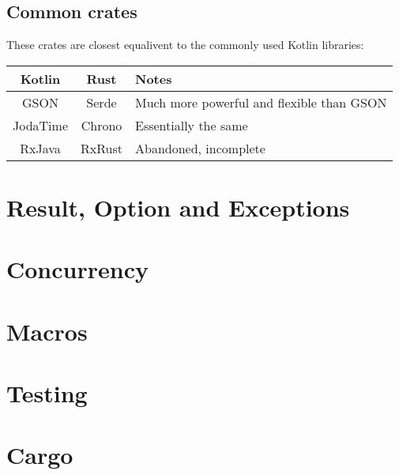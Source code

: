 \documentclass[a4paper,11pt]{article}
\begin{document}
\subsection{Common crates}
These crates are closest equalivent to the commonly used Kotlin libraries:
\begin{center}
\begin{tabular}{ c|c|l } 
 Kotlin & Rust & Notes \\ 
 \hline
 GSON & Serde & Much more powerful and flexible than GSON \\
 JodaTime & Chrono & Essentially the same \\
 RxJava & RxRust & Abandoned, incomplete \\
\end{tabular}
\end{center}

\renewcommand{\arraystretch}{1}

\newpage
\section{Result, Option and Exceptions}

\newpage
\section{Concurrency}

\newpage
\section{Macros}

\newpage
\section{Testing}

\newpage
\section{Cargo}
\end{document}
